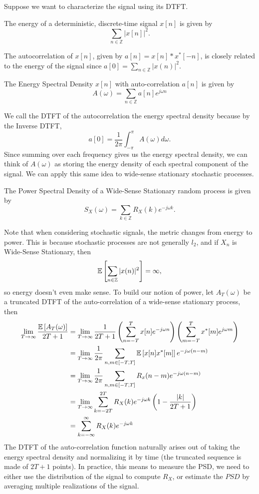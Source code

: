 Suppose we want to characterize the signal using its DTFT.
\begin{definition}
	The energy of a deterministic, discrete-time signal $x[n]$ is given by \[
		\sum_{n\in\mathbb{Z}}|x[n]|^2.
	\]
	\label{defn:energy}
\end{definition}
The autocorrelation of $x[n]$, given by $a[n] = x[n] * x^*[-n]$, is closely related to the energy of the signal since $a[0] = \sum_{n\in\mathbb{Z}}|x(n)|^2$.
\begin{definition}
	The Energy Spectral Density $x[n]$ with auto-correlation $a[n]$ is given by \[
		A(\omega) = \sum_{n\in\mathbb{Z}}a[n]e^{j\omega n}
	\]
	\label{defn:esd}
\end{definition}
We call the DTFT of the autocorrelation the energy spectral density because by the Inverse DTFT, \[
	a[0] = \frac{1}{2\pi}\int_{-\pi}^{\pi}A(\omega)d\omega.
\]
Since summing over each frequency gives us the energy spectral density, we can think of $A(\omega)$ as storing the energy density of each spectral component of the signal.
We can apply this same idea to wide-sense stationary stochastic processes.
\begin{definition}
	The Power Spectral Density of a Wide-Sense Stationary random process is given by \[
		S_X(\omega) = \sum_{k\in\mathbb{Z}}R_X(k)e^{-j\omega k}.
	\]
	\label{defn:psd}
\end{definition}
Note that when considering stochastic signals, the metric changes from energy to power.
This is because stochastic processes are not generally $l_2$, and if $X_n$ is Wide-Sense Stationary, then \[
	\mathbb{E}\left[\sum_{n\in\mathbb{Z}}|x(n)|^2\right] = \infty,
\]
so energy doesn't even make sense.
To build our notion of power, let $A_T(\omega)$ be a truncated DTFT of the auto-correlation of a wide-sense stationary process, then
\begin{align*}
	\lim_{T\to\infty} \frac{\mathbb{E}\left[A_T(\omega)\right]}{2T + 1} &= \lim_{T\to\infty}\frac{1}{2T+1}\left(\sum_{n=-T}^Tx[n]e^{-j\omega n}\right)\left(\sum_{m=-T}^Tx^*[m]e^{j\omega m}\right)\\
	&= \lim_{T\to\infty}	\frac{1}{2\pi} \sum_{n,m \in [-T,T]}\mathbb{E}\left[x[n]x^*[m]\right]e^{-j\omega(n-m)}\\
	&= \lim_{T\to\infty}	\frac{1}{2\pi} \sum_{n,m \in [-T,T]}R_x(n-m)e^{-j\omega(n-m)}\\
	&= \lim_{T\to\infty} \sum_{k=-2T}^{2T}R_X(k)e^{-j\omega k}\left(1 - \frac{|k|}{2T+1}\right)\\
	&= \sum_{k=-\infty}^{\infty}R_X(k)e^{-j\omega k}
\end{align*}
The DTFT of the auto-correlation function naturally arises out of taking the energy spectral density and normalizing it by time (the truncated sequence is made of $2T+1$ points).
In practice, this means to measure the PSD, we need to either use the distribution of the signal to compute $R_X$, or estimate the $PSD$ by averaging multiple realizations of the signal.


